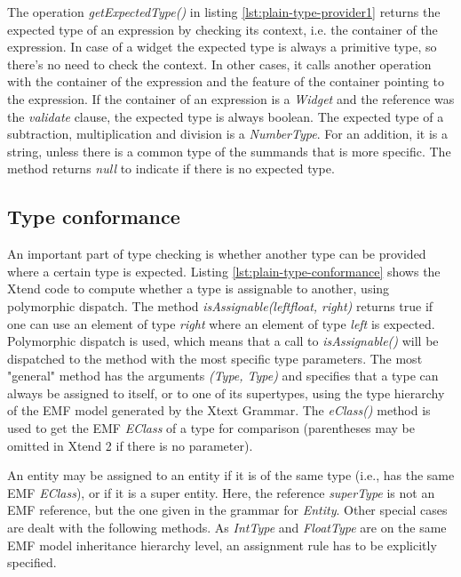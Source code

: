 

The operation \emph{getExpectedType()} in listing \ref{lst:plain-type-provider1}
returns the expected type of an expression by checking its context, i.e. the
container of the expression. In case of a widget the expected type is always a
primitive type, so there's no need to check the context. In other cases, it
calls another operation with the container of the expression and the feature of
the container pointing to the expression. If the container of an expression is a
\emph{Widget} and the reference was the \emph{validate} clause, the expected
type is always boolean. The expected type of a subtraction, multiplication and
division is a \emph{NumberType}. For an addition, it is a string, unless there
is a common type of the summands that is more specific. The method returns
\emph{null} to indicate if there is no expected type.

%

\subsection{Type conformance}
An important part of type checking is whether another type can be provided where
a certain type is expected.
Listing \ref{lst:plain-type-conformance} shows the Xtend code to compute whether
a type is assignable to another, using polymorphic dispatch. The method
\emph{isAssignable(leftfloat, right)} returns true if one can use an element of
type \emph{right} where an element of type \emph{left} is expected. Polymorphic
dispatch is used, which means that a call to \emph{isAssignable()} will be
dispatched to the method with the most specific type parameters. The most
"general" method has the arguments \emph{(Type, Type)} and specifies that a type
can always be assigned to itself, or to one of its supertypes, using the type
hierarchy of the EMF model generated by the Xtext Grammar. The \emph{eClass()}
method is used to get the EMF \emph{EClass} of a type for comparison
(parentheses may be omitted in Xtend 2 if there is no parameter).

An entity may be assigned to an entity if it is of the same type (i.e., has the
same EMF \emph{EClass}), or if it is a super entity. Here, the reference
\emph{superType} is not an EMF reference, but the one given in the grammar for
\emph{Entity}. Other special cases are dealt with the following methods. As
\emph{IntType} and \emph{FloatType} are on the same EMF model inheritance
hierarchy level, an assignment rule has to be explicitly specified.

